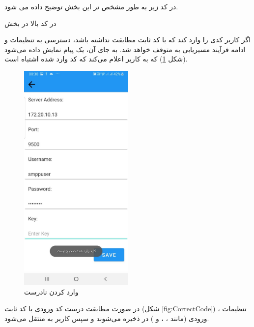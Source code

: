 \documentclass{report}
\begin{document}
در کد زیر به طور مشخص تر این بخش توضیح داده می شود.
\begin{latin}
	
	\label{code:Access}
\end{latin}
در کد بالا در بخش
\begin{latin}
	
	\label{code:AccessIf}
\end{latin}
اگر کاربر کدی را وارد کند که با کد ثابت 
مطابقت نداشته باشد، دسترسی به تنظیمات و ادامه فرآیند مسیر‌یابی به
 متوقف خواهد شد. به جای آن، یک پیام
   نمایش داده می‌شود (شکل \ref{fig:WrongCode}) که به کاربر اعلام می‌کند که کد وارد شده اشتباه است.
\begin{figure}[b]
	\centering
	\includegraphics[width=0.5\textwidth]{Pic/WrongCode}
	\caption{وارد کردن 
	نادرست
	}
	\label{fig:WrongCode}
\end{figure}
در صورت مطابقت درست کد ورودی با کد ثابت (شکل \ref{fig:CorrectCode})
 ، تنظیمات ورودی (مانند
  ،
   ،
     و
      ) در
       ذخیره می‌شوند و سپس کاربر به
         منتقل می‌شود.
\end{document}
